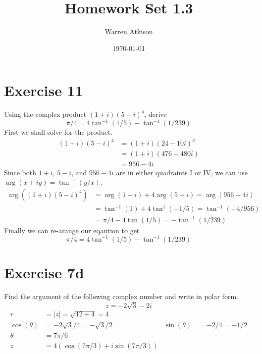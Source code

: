 \documentclass{article}
\title{Homework Set 1.3}
\author{Warren Atkison}
\date{\today}
\begin{document}
\maketitle

\section*{Exercise 11}
Using the complex product $(1 + i)(5 - i)^4$, derive
\[
	\pi/4 = 4\tan^{-1}(1/5) - \tan^{-1}(1/239)
\]
First we shall solve for the product.
\begin{align*}
	(1 + i)(5 - i)^4 &= (1 + i)(24 - 10i)^2 \\
			 &= (1 + i)(476 - 480i) \\
			 &= 956 - 4i
\end{align*}
Since both $1 + i$, $5 - i$, and $956 - 4i$ are in either quadraints I or IV, we can use $\arg(x + iy) = \tan^{-1}(y/x)$.
\begin{align*}	
	\arg((1 + i)(5-i)^4) &= \arg(1 + i) + 4\arg(5 - i) = \arg(956 - 4i) \\
			     &= \tan^{-1}(1) + 4\tan^{1}(-1/5) = \tan^{-1}(-4/956) \\
			     &= \pi/4 - 4\tan(1/5) = -\tan^{-1}(1/239)
\end{align*}
Finally we can re-arange our eqaution to get
\[
	\pi/4 = 4\tan^{-1}(1/5) - \tan^{-1}(1/239)	
\]
\newpage
\section*{Exercise 7d}
Find the argument of the following complex number and write in polar form.
\[
	z = -2\sqrt{3}-2i 
\]
\begin{align*}
	r &= |z| = \sqrt{12 + 4} = 4 \\
	\cos(\theta) &= -2\sqrt{3} /4 = -\sqrt{3}/2 & \sin(\theta) &= -2/4 = -1/2 \\
	\theta &= 7\pi/6 \\
	z &= 4(\cos(7\pi/3) + i\sin(7\pi/3))
\end{align*}
\end{document}
